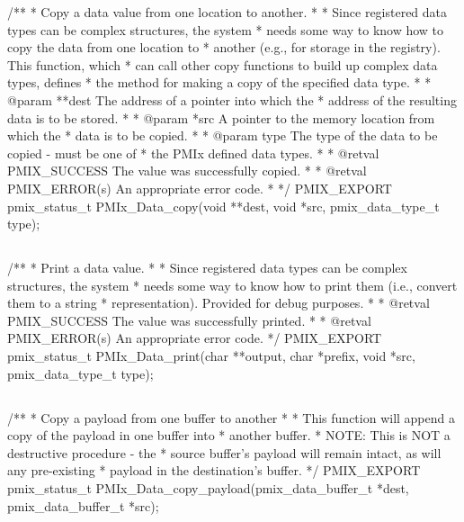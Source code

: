 \cspecificstart
\begin{codepar}
/**
 * Copy a data value from one location to another.
 *
 * Since registered data types can be complex structures, the system
 * needs some way to know how to copy the data from one location to
 * another (e.g., for storage in the registry). This function, which
 * can call other copy functions to build up complex data types, defines
 * the method for making a copy of the specified data type.
 *
 * @param **dest The address of a pointer into which the
 * address of the resulting data is to be stored.
 *
 * @param *src A pointer to the memory location from which the
 * data is to be copied.
 *
 * @param type The type of the data to be copied - must be one of
 * the PMIx defined data types.
 *
 * @retval PMIX_SUCCESS The value was successfully copied.
 *
 * @retval PMIX_ERROR(s) An appropriate error code.
 *
 */
PMIX_EXPORT pmix_status_t PMIx_Data_copy(void **dest, void *src,
                                         pmix_data_type_t type);
\end{codepar}
\cspecificend


\subsection{}

\cspecificstart
\begin{codepar}
/**
 * Print a data value.
 *
 * Since registered data types can be complex structures, the system
 * needs some way to know how to print them (i.e., convert them to a string
 * representation). Provided for debug purposes.
 *
 * @retval PMIX_SUCCESS The value was successfully printed.
 *
 * @retval PMIX_ERROR(s) An appropriate error code.
 */
PMIX_EXPORT pmix_status_t PMIx_Data_print(char **output, char *prefix,
                                          void *src, pmix_data_type_t type);
\end{codepar}
\cspecificend


\subsection{}

\cspecificstart
\begin{codepar}
/**
 * Copy a payload from one buffer to another
 *
 * This function will append a copy of the payload in one buffer into
 * another buffer.
 * NOTE: This is NOT a destructive procedure - the
 * source buffer's payload will remain intact, as will any pre-existing
 * payload in the destination's buffer.
 */
PMIX_EXPORT pmix_status_t PMIx_Data_copy_payload(pmix_data_buffer_t *dest,
                                                 pmix_data_buffer_t *src);
\end{codepar}
\cspecificend



